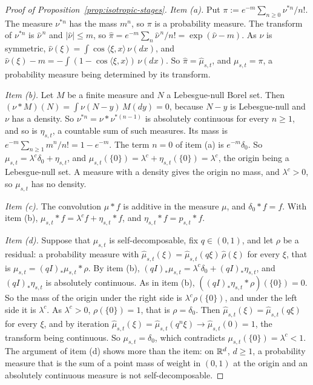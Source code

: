 \begin{proof}[Proof of Proposition~\ref{prop:isotropic-stages}]
\emph{Item (a).} Put $\pi := e^{-m}\sum_{n \ge 0}\nu^{*n}/n!$. The measure $\nu^{*n}$ has the
mass $m^n$, so $\pi$ is a probability measure. The transform of $\nu^{*n}$ is $\widehat\nu^{\,n}$
and $|\widehat\nu| \le m$, so $\widehat\pi = e^{-m}\sum_n\widehat\nu^{\,n}/n!
= \exp(\widehat\nu - m)$. As $\nu$ is symmetric, $\widehat\nu(\xi) = \int\cos\langle\xi,x\rangle
\,\nu(dx)$, and $\widehat\nu(\xi) - m = -\int(1 - \cos\langle\xi,x\rangle)\,\nu(dx)$. So
$\widehat\pi = \widehat\mu_{s,t}$, and $\mu_{s,t} = \pi$, a probability measure being determined
by its transform.

\emph{Item (b).} Let $M$ be a finite measure and $N$ a Lebesgue-null Borel set. Then
$(\nu * M)(N) = \int\nu(N - y)\,M(dy) = 0$, because $N - y$ is Lebesgue-null and $\nu$ has a
density. So $\nu^{*n} = \nu * \nu^{*(n-1)}$ is absolutely continuous for every $n \ge 1$, and so
is $\eta_{s,t}$, a countable sum of such measures. Its mass is
$e^{-m}\sum_{n \ge 1}m^n/n! = 1 - e^{-m}$. The term $n = 0$ of item (a) is $e^{-m}\delta_0$.
So $\mu_{s,t} = \lambda^c\delta_0 + \eta_{s,t}$, and
$\mu_{s,t}(\{0\}) = \lambda^c + \eta_{s,t}(\{0\}) = \lambda^c$, the origin being a Lebesgue-null
set. A measure with a density gives the origin no mass, and $\lambda^c > 0$, so $\mu_{s,t}$ has
no density.

\emph{Item (c).} The convolution $\mu * f$ is additive in the measure $\mu$, and
$\delta_0 * f = f$. With item (b),
$\mu_{s,t} * f = \lambda^c f + \eta_{s,t} * f$, and $\eta_{s,t} * f = p_{s,t} * f$.

\emph{Item (d).} Suppose that $\mu_{s,t}$ is self-decomposable, fix $q \in (0,1)$, and let
$\rho$ be a residual: a probability measure with
$\widehat\mu_{s,t}(\xi) = \widehat\mu_{s,t}(q\xi)\,\widehat\rho(\xi)$ for every $\xi$, that is
$\mu_{s,t} = (qI)_*\mu_{s,t} * \rho$. By item (b),
$(qI)_*\mu_{s,t} = \lambda^c\delta_0 + (qI)_*\eta_{s,t}$, and $(qI)_*\eta_{s,t}$ is absolutely
continuous. As in item (b), $((qI)_*\eta_{s,t} * \rho)(\{0\}) = 0$. So the mass of the origin
under the right side is $\lambda^c\rho(\{0\})$, and under the left side it is $\lambda^c$. As
$\lambda^c > 0$, $\rho(\{0\}) = 1$, that is $\rho = \delta_0$. Then
$\widehat\mu_{s,t}(\xi) = \widehat\mu_{s,t}(q\xi)$ for every $\xi$, and by iteration
$\widehat\mu_{s,t}(\xi) = \widehat\mu_{s,t}(q^n\xi) \to \widehat\mu_{s,t}(0) = 1$, the transform
being continuous. So $\mu_{s,t} = \delta_0$, which contradicts $\mu_{s,t}(\{0\}) = \lambda^c < 1$.
The argument of item (d) shows more than the item: on $\mathbb{R}^d$, $d \ge 1$, a probability measure that is the
sum of a point mass of weight in $(0,1)$ at the origin and an absolutely continuous measure is
not self-decomposable.


\end{proof}
